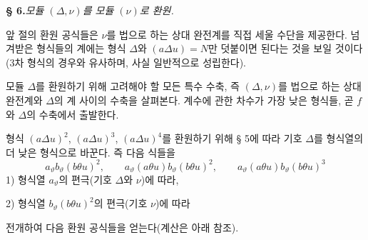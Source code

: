 
\begin{center}
\textbf{§ 6.}\quad\emph{모듈 $(\Delta,\nu)$를 모듈 $(\nu)$로 환원.}
\end{center}

앞 절의 환원 공식들은 $\nu$를 법으로 하는 상대 완전계를 직접 세울 수단을 제공한다. 넘겨받은 형식들의 계에는 형식 $\Delta$와 $(a\Delta u)=N$만 덧붙이면 된다는 것을 보일 것이다(3차 형식의 경우와 유사하며, 사실 일반적으로 성립한다).

모듈 $\Delta$를 환원하기 위해 고려해야 할 모든 특수 수축, 즉 $(\Delta,\nu)$를 법으로 하는 상대 완전계와 $\Delta$의 계 사이의 수축을 살펴본다. 계수에 관한 차수가 가장 낮은 형식들, 곧 $f$와 $\Delta$의 수축에서 출발한다.

형식 $(a\Delta u)^2$, $(a\Delta u)^3$, $(a\Delta u)^4$를 환원하기 위해 § 5에 따라 기호 $\Delta$를 형식열의 더 낮은 형식으로 바꾼다. 즉 다음 식들을
\[
a_\vartheta b_\vartheta(b\theta u)^2,
\qquad a_\vartheta(a\theta u)b_\vartheta(b\theta u)^2,
\qquad a_\vartheta(a\theta u)b_\vartheta(b\theta u)^3
\]
1) 형식열 $a_\vartheta$의 편극(기호 $\Delta$와 $\nu$)에 따라,

2) 형식열 $b_\vartheta(b\theta u)^2$의 편극(기호 $\nu$)에 따라

전개하여 다음 환원 공식들을 얻는다(계산은 아래 참조).
